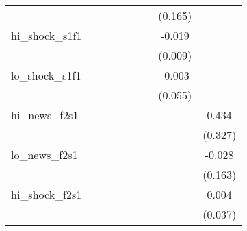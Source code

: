 {\begin{tabular}{l*{8}{c}}
            &                     &                     &                     &                     &                     &                     &     (0.165)         &                     \\
\addlinespace
hi\_shock\_s1f1&                     &                     &                     &                     &                     &                     &      -0.019\sym{**} &                     \\
            &                     &                     &                     &                     &                     &                     &     (0.009)         &                     \\
\addlinespace
lo\_shock\_s1f1&                     &                     &                     &                     &                     &                     &      -0.003         &                     \\
            &                     &                     &                     &                     &                     &                     &     (0.055)         &                     \\
\addlinespace
hi\_news\_f2s1&                     &                     &                     &                     &                     &                     &                     &       0.434         \\
            &                     &                     &                     &                     &                     &                     &                     &     (0.327)         \\
\addlinespace
lo\_news\_f2s1&                     &                     &                     &                     &                     &                     &                     &      -0.028         \\
            &                     &                     &                     &                     &                     &                     &                     &     (0.163)         \\
\addlinespace
hi\_shock\_f2s1&                     &                     &                     &                     &                     &                     &                     &       0.004         \\
            &                     &                     &                     &                     &                     &                     &                     &     (0.037)         \\

\end{tabular}}
